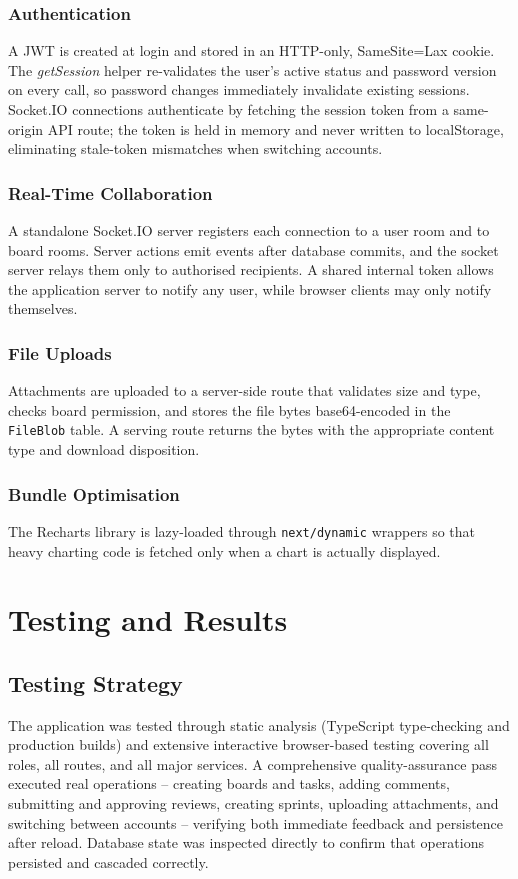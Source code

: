 \documentclass[12pt,a4paper]{report}
\begin{document}
\subsection{Authentication}
A JWT is created at login and stored in an HTTP-only, SameSite=Lax cookie. The
\emph{getSession} helper re-validates the user's active status and password
version on every call, so password changes immediately invalidate existing
sessions. Socket.IO connections authenticate by fetching the session token from a
same-origin API route; the token is held in memory and never written to
localStorage, eliminating stale-token mismatches when switching accounts.
\subsection{Real-Time Collaboration}
A standalone Socket.IO server registers each connection to a user room and to
board rooms. Server actions emit events after database commits, and the socket
server relays them only to authorised recipients. A shared internal token allows
the application server to notify any user, while browser clients may only notify
themselves.
\subsection{File Uploads}
Attachments are uploaded to a server-side route that validates size and type,
checks board permission, and stores the file bytes base64-encoded in the
\texttt{FileBlob} table. A serving route returns the bytes with the appropriate
content type and download disposition.
\subsection{Bundle Optimisation}
The Recharts library is lazy-loaded through \texttt{next/dynamic} wrappers so that
heavy charting code is fetched only when a chart is actually displayed.

\chapter{Testing and Results}
\label{ch:testing}

\section{Testing Strategy}
The application was tested through static analysis (TypeScript type-checking and
production builds) and extensive interactive browser-based testing covering all
roles, all routes, and all major services. A comprehensive quality-assurance pass
executed real operations -- creating boards and tasks, adding comments, submitting
and approving reviews, creating sprints, uploading attachments, and switching
between accounts -- verifying both immediate feedback and persistence after
reload. Database state was inspected directly to confirm that operations persisted
and cascaded correctly.
\end{document}
